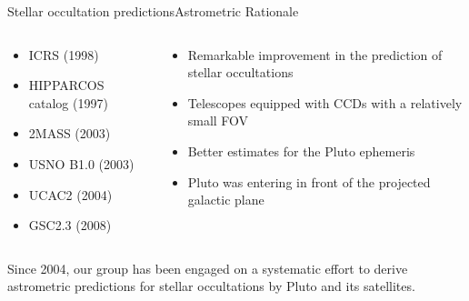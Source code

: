 \begin{frame}[c]{Stellar occultation predictions}{Astrometric Rationale}
\footnotesize{
		\begin{columns}[t]
		\begin{column}[T]{5.5cm}
			\begin{itemize}
			\item ICRS (1998)
			\item HIPPARCOS catalog (1997)
			\item 2MASS (2003)
			\item USNO B1.0 (2003)
			\item UCAC2 (2004)
			\item GSC2.3 (2008)
			\end{itemize}
		\end{column} \pause
		\begin{column}[T]{5.5cm}
				\begin{itemize}
			\item Remarkable improvement in the prediction of stellar occultations
			\item Telescopes equipped with CCDs with a relatively small FOV
			\item Better estimates for the Pluto ephemeris
			\item Pluto was entering in front of the projected galactic plane
			\end{itemize}
		\end{column}
		\end{columns}} \pause
\vspace{0.4 cm}
	\begin{block}{}
		Since 2004, our group has been engaged on a systematic effort to derive astrometric predictions for stellar occultations by Pluto and its satellites.
	\end{block}

\end{frame}

